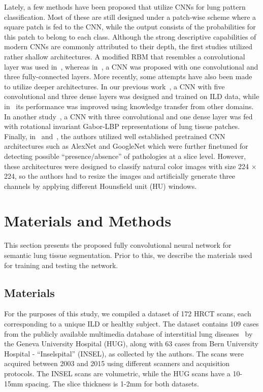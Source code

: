 \documentclass[journal]{IEEEtran}
\begin{document}
Lately, a few methods have been proposed that utilize CNNs for lung pattern classification. Most of these are still designed under a patch-wise scheme where a square patch is fed to the CNN, while the output consists of the probabilities for this patch to belong to each class. Although the strong descriptive capabilities of modern CNNs are commonly attributed to their depth, the first studies utilized rather shallow architectures. A modified RBM that resembles a convolutional layer was used in~\cite{van2014learning}, whereas in~\cite{li2014medical}, a CNN was proposed with one convolutional and three fully-connected layers. More recently, some attempts have also been made to utilize deeper architectures. In our previous work~\cite{AnthimoTMI}, a CNN with five convolutional and three dense layers was designed and trained on ILD data, while in~\cite{christodoulidis2017multi} its performance was improved using knowledge transfer from other domains. In another study~\cite{wang2017multi}, a CNN with three convolutional and one dense layer was fed with rotational invariant Gabor-LBP representations of lung tissue patches. Finally, in~\cite{shin2016deep} and~\cite{gao2017holistic}, the authors utilized well established pretrained CNN architectures such as AlexNet and GoogleNet which were further finetuned for detecting possible ``presence/absence'' of pathologies at a slice level. However, these architectures were designed to classify natural color images with size 224 $\times$ 224, so the authors had to resize the images and artificially generate three channels by applying different Hounsfield unit (HU) windows.
\section{Materials and Methods}
This section presents the proposed fully convolutional neural network for semantic lung tissue segmentation. Prior to this, we describe the materials used for training and testing the network.

\subsection{Materials}
For the purposes of this study, we compiled a dataset of 172 HRCT scans, each corresponding to a unique ILD or healthy subject. The dataset contains 109 cases from the publicly available multimedia database of interstitial lung diseases~\cite{depeursinge2012building} by the Geneva University Hospital (HUG), along with 63 cases from Bern University Hospital - ``Inselspital'' (INSEL), as collected by the authors. The scans were acquired between 2003 and 2015 using different scanners and acquisition protocols. The INSEL scans are volumetric, while the HUG scans have a 10-15mm spacing. The slice thickness is 1-2mm for both datasets.
\end{document}
